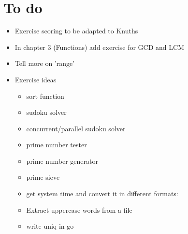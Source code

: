 \section{To do}

\begin{itemize}
\item
Exercise scoring to be adapted to Knuths
\item
In chapter 3 (Functions) add exercise for GCD and LCM
\item
Tell more on 'range'
\item
Exercise ideas
\begin{itemize}
\item
sort function
\item
sudoku solver
\item
concurrent/parallel sudoku solver
\item
prime number tester
\item
prime number generator
\item
prime sieve
\item
get system time and convert it in different formats:
\item
Extract uppercase words from a file
\item
write uniq in go
\end{itemize}
\end{itemize}
